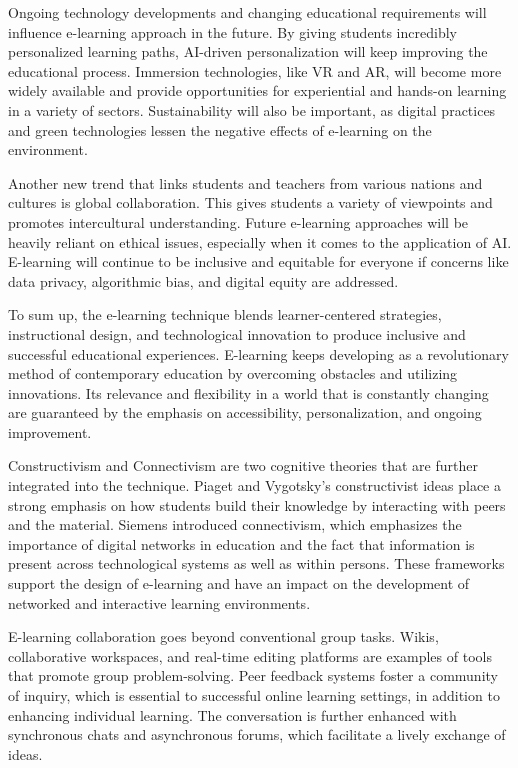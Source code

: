 \documentclass[BTech]{audiss}
\begin{document}
Ongoing technology developments and changing educational requirements will influence e-learning approach in the future. By giving students incredibly personalized learning paths, AI-driven personalization will keep improving the educational process. Immersion technologies, like VR and AR, will become more widely available and provide opportunities for experiential and hands-on learning in a variety of sectors. Sustainability will also be important, as digital practices and green technologies lessen the negative effects of e-learning on the environment.

Another new trend that links students and teachers from various nations and cultures is global collaboration. This gives students a variety of viewpoints and promotes intercultural understanding. Future e-learning approaches will be heavily reliant on ethical issues, especially when it comes to the application of AI. E-learning will continue to be inclusive and equitable for everyone if concerns like data privacy, algorithmic bias, and digital equity are addressed.

To sum up, the e-learning technique blends learner-centered strategies, instructional design, and technological innovation to produce inclusive and successful educational experiences. E-learning keeps developing as a revolutionary method of contemporary education by overcoming obstacles and utilizing innovations. Its relevance and flexibility in a world that is constantly changing are guaranteed by the emphasis on accessibility, personalization, and ongoing improvement.

Constructivism and Connectivism are two cognitive theories that are further integrated into the technique. Piaget and Vygotsky's constructivist ideas place a strong emphasis on how students build their knowledge by interacting with peers and the material. Siemens introduced connectivism, which emphasizes the importance of digital networks in education and the fact that information is present across technological systems as well as within persons. These frameworks support the design of e-learning and have an impact on the development of networked and interactive learning environments.

E-learning collaboration goes beyond conventional group tasks. Wikis, collaborative workspaces, and real-time editing platforms are examples of tools that promote group problem-solving. Peer feedback systems foster a community of inquiry, which is essential to successful online learning settings, in addition to enhancing individual learning. The conversation is further enhanced with synchronous chats and asynchronous forums, which facilitate a lively exchange of ideas.
\end{document}
